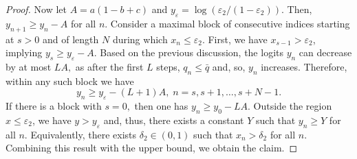 \documentclass[10pt,a4paper]{amsart}
\begin{document}
\begin{proof}
Now let $A=a(1-b+c)$ and $y_{\varepsilon}=\log \left( \varepsilon_2/( 1-\varepsilon_2) \right)$. Then, $y_{n+1}\geq y_n-A$ for all $n$. Consider a maximal block of consecutive indices starting at $s>0$ and of length $N$ during which \(x_n\leq\varepsilon_2\). First, we have $x_{s-1}>\varepsilon_2$, implying $y_s\geq y_{\varepsilon}-A$. Based on the previous discussion, the logits $y_n$ can decrease by at most $LA,$ as after the first $L$ steps, $q_n \leq \bar q$ and, so, $y_n$ increases. Therefore, within any such block we have
\[
y_{n} \geq y_\varepsilon-(L+1)A,\; n=s,s+1,\dots,s+N-1.
\]
If there is a block with $s=0,$ then one has $y_n\geq y_0-LA.$ Outside the region \(x\leq\varepsilon_2\), we have \(y>y_{\varepsilon}\) and, thus, there exists a constant $Y$ such that $y_n\geq Y$ for all $n.$ Equivalently, there exists $\delta_2 \in(0,1)$ such that $x_n > \delta_2$ for all $n$. Combining this result with the upper bound, we obtain the claim.

\end{proof}
\end{document}
